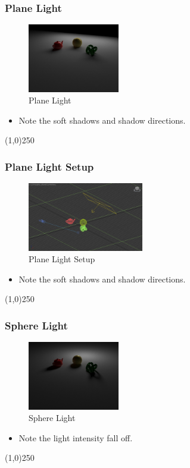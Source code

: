 \begin{frame}
	\frametitle{Plane Light}
	\begin{figure}
		\centering
		\includegraphics[height=3cm]{./Lights/PlaneLight}
		\caption{Plane Light}
		\label{fig:PlaneLight}
	\end{figure}
	\begin{itemize}
		\item Note the soft shadows and shadow directions.
	\end{itemize}
\end{frame}
\begin{center}\line(1,0){250}\end{center}


\begin{frame}
	\frametitle{Plane Light Setup}
	\begin{figure}
		\centering
		\includegraphics[height=3cm]{./Lights/PlaneLightSetup}
		\caption{Plane Light Setup}
		\label{fig:PlaneLightSetup}
	\end{figure}
	\begin{itemize}
		\item Note the soft shadows and shadow directions.
	\end{itemize}
\end{frame}
\begin{center}\line(1,0){250}\end{center}





\begin{frame}
	\frametitle{Sphere Light}
	\begin{figure}
		\centering
		\includegraphics[height=3cm]{./Lights/Sphere}
		\caption{Sphere Light}
		\label{fig:SphereLight}
	\end{figure}
	\begin{itemize}
		\item Note the light intensity fall off.
	\end{itemize}
\end{frame}
\begin{center}\line(1,0){250}\end{center}



